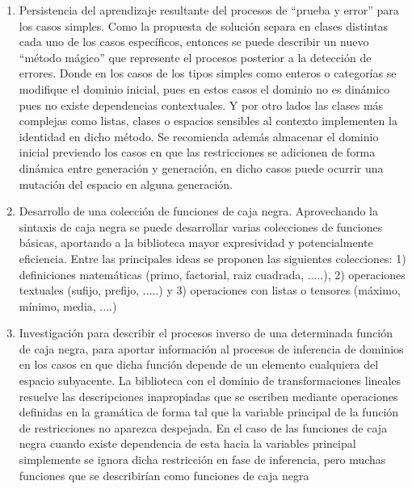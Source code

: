 \begin{recomendations}
    \begin{enumerate}
        \item   Persistencia del aprendizaje resultante del procesos de “prueba y error” para los casos
              simples. Como la propuesta de solución separa en clases distintas cada uno de los casos
              específicos, entonces se puede describir un nuevo “método mágico” que represente el procesos
              posterior a la detección de errores. Donde en los casos de los tipos simples como enteros o
              categorías se modifique el dominio inicial, pues en estos casos el dominio no es dinámico pues
              no existe dependencias contextuales. Y por otro lados las clases más complejas como listas,
              clases o espacios sensibles al contexto implementen la identidad en dicho método. Se
              recomienda además almacenar el dominio inicial previendo los casos en que las restricciones
              se adicionen de forma dinámica entre generación y generación, en dicho casos puede ocurrir
              una mutación del espacio en alguna generación.
        \item  Desarrollo de una colección de funciones de caja negra. Aprovechando la sintaxis de
              caja negra se puede desarrollar varias colecciones de funciones básicas, aportando a la biblioteca
              mayor expresividad y potencialmente eficiencia. Entre las principales ideas se proponen las
              siguientes colecciones: 1) definiciones matemáticas (primo, factorial, raiz cuadrada, .....),
              2) operaciones textuales (sufijo, prefijo, .....) y 3) operaciones con listas o tensores (máximo,
              mínimo, media, ....)
        \item  Investigación para describir el procesos inverso de una determinada función de caja negra,
              para aportar información al procesos de inferencia de dominios en los casos en que dicha función
              depende de un elemento cualquiera del espacio subyacente. La biblioteca con el dominio de
              transformaciones lineales resuelve las descripciones inapropiadas que se escriben mediante
              operaciones definidas en la gramática de forma tal que la variable principal de la función de
              restricciones no aparezca despejada. En el caso de las funciones de caja negra cuando existe
              dependencia de esta hacia la variables principal simplemente se ignora dicha restricción en
              fase de inferencia, pero muchas funciones que se describirían como funciones de caja negra

\end{enumerate}
\end{recomendations}
